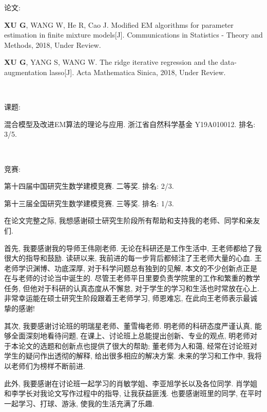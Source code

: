 \documentclass[a4paper,12pt,openany,oneside,utf-8]{ctexbook}
\newcommand{\sanhao}{\fontsize{15.75pt}{\baselineskip}\selectfont}
\begin{document}
论文:

\textbf{XU G}, WANG W, He R, Cao J. Modified EM algorithms for parameter estimation in finite mixture models[J]. Communications in Statistics - Theory and Methods, 2018, Under Review.

\textbf{XU G}, YANG S, WANG W. The ridge iterative regression and the data-augmentation lasso[J]. Acta Mathematica Sinica, 2018, Under Review.

\

课题:

混合模型及改进EM算法的理论与应用. 浙江省自然科学基金 Y19A010012. 排名: 3/5.

\

竞赛:

第十四届中国研究生数学建模竞赛. 二等奖. 排名: 2/3.

第十三届全国研究生数学建模竞赛. 三等奖. 排名: 1/3.




\newpage
\pagestyle{fancy}
\begin{center}
\heiti\sanhao {致\quad 谢}
\end{center}


在论文完整之际, 我想感谢硕士研究生阶段所有帮助和支持我的老师、同学和亲友们.

首先, 我要感谢我的导师王伟刚老师. 无论在科研还是工作生活中, 王老师都给了我很大的指导和鼓励. 读研以来, 我前进的每一步背后都倾注了王老师大量的心血. 王老师学识渊博、功底深厚, 对于科学问题总有独到的见解, 本文的不少创新点正是在与老师的讨论当中诞生的. 尽管王老师平日里要负责学院里的工作和繁重的教学任务, 但他对于科研的认真态度从不懈怠, 对于学生的学习和生活也时常放在心上. 非常幸运能在硕士研究生阶段跟着王老师学习, 师恩难忘, 在此向王老师表示最诚挚的感谢!

其次, 我要感谢讨论班的明瑞星老师、董雪梅老师. 明老师的科研态度严谨认真, 能够全面深刻地看待问题, 在课上、讨论班上总能提出创新、专业的观点, 明老师对于本论文的选题和创新点也提供了很大的帮助; 董老师为人和蔼, 经常在讨论班对学生的疑问作出透彻的解释, 给出很多相应的解决方案. 未来的学习和工作中, 我将以老师们为榜样不断前进.

此外, 我要感谢在讨论班一起学习的肖敏学姐、李亚旭学长以及各位同学. 肖学姐和李学长对我论文写作过程中的指导, 让我获益匪浅. 也要感谢班里的同学, 在平时一起学习、打球、游泳, 使我的生活充满了乐趣.
\end{document}
